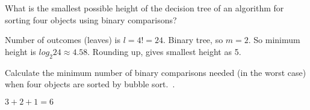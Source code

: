 \documentclass[a4paper, 12pt]{exam}
\begin{document}
\begin{questions}
\question
  What is the smallest possible height of the decision tree of an algorithm for sorting four objects using binary comparisons?~\cite{biggs02}

  \begin{solution}
    Number of outcomes (leaves) is \(l = 4! = 24\).
    Binary tree, so \(m = 2\).
    So minimum height is \(log_2 24 \approx 4.58\).
    Rounding up, gives smallest height as 5.
  \end{solution}

\question
  Calculate the minimum number of binary comparisons needed (in the worst case) when four objects are sorted by bubble sort.~\cite{biggs02}.
  \begin{solution}
    \(3 + 2 + 1 = 6\)
  \end{solution}

\end{questions}



\end{document}
